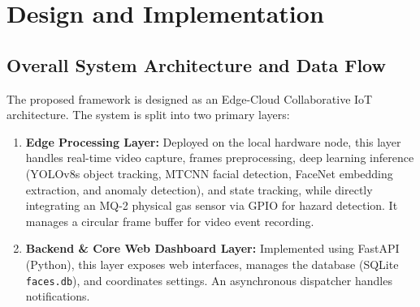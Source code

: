 \documentclass[12pt,a4paper]{article}
\begin{document}
\section{Design and Implementation}

\subsection{Overall System Architecture and Data Flow}
The proposed framework is designed as an Edge-Cloud Collaborative IoT architecture. The system is split into two primary layers:
\begin{enumerate}
    \item \textbf{Edge Processing Layer:} Deployed on the local hardware node, this layer handles real-time video capture, frames preprocessing, deep learning inference (YOLOv8s object tracking, MTCNN facial detection, FaceNet embedding extraction, and anomaly detection), and state tracking, while directly integrating an MQ-2 physical gas sensor via GPIO for hazard detection. It manages a circular frame buffer for video event recording.
    \item \textbf{Backend \& Core Web Dashboard Layer:} Implemented using FastAPI (Python), this layer exposes web interfaces, manages the database (SQLite \texttt{faces.db}), and coordinates settings. An asynchronous dispatcher handles notifications.
\end{enumerate}
\end{document}
